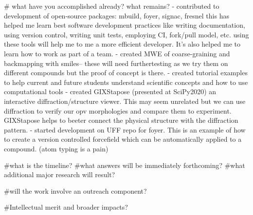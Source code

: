 # what have you accomplished already? what remains?
- contributed to development of open-source packages: mbuild, foyer, signac, fresnel
 this has helped me learn best software development practices like writing documentation, using version control, writing unit tests, employing CI, fork/pull model, etc. using these tools will help me to me a more efficient developer. It's also helped me to learn how to work as part of a team.
 - created MWE of coarse-graining and backmapping with smiles-- these will need furthertesting as we try them on different compounds but the proof of concept is there.
 - created tutorial examples to help current and future students understand scientific concepts and how to use computational tools
 - created GIXStapose (presented at SciPy2020) an interactive diffraction/structure viewer. This may seem unrelated but we can use diffraction to verify our opv morphologies and compare them to experiment. GIXStapose helps to beeter connect the physical structure with the diffraction pattern.
- started development on UFF repo for foyer. This is an example of how to create a version controlled forcefield which can be automatically applied to a compound. (atom typing is a pain)

#what is the timeline?
#what answers will be immediately forthcoming?
#what additional major research will result?

#will the work involve an outreach component?

#Intellectual merit and broader impacts?

